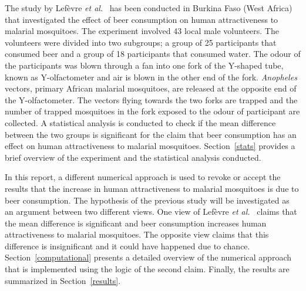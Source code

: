 The study by Lef\`evre \textit{et al.}~\cite{lefevre2010beer} has been conducted in Burkina Faso (West Africa) that investigated the effect of beer consumption on human attractiveness to malarial mosquitoes. The experiment involved 43 local male volunteers. The volunteers were divided into two subgroups; a group of 25 participants that consumed beer and a group of 18 participants that consumed water. The odour of the participants was blown through a fan into one fork of the Y-shaped tube, known as Y-olfactometer and air is blown in the other end of the fork. \textit{Anopheles} vectors, primary African malarial mosquitoes, are released at the opposite end of the Y-olfactometer. The vectors flying towards the two forks are trapped and the number of trapped mosquitoes in the fork exposed to the odour of participant are collected. A statistical analysis is conducted to check if the mean difference between the two groups is significant for the claim that beer consumption has an effect on human attractiveness to malarial mosquitoes. Section~\ref{stats} provides a brief overview of the experiment and the statistical analysis conducted.

In this report, a different numerical approach is used to revoke or accept the results that the increase in human attractiveness to malarial mosquitoes is due to beer consumption. The hypothesis of the previous study will be investigated as an argument between two different views. One view of Lef\`evre \textit{et al.}~\cite{lefevre2010beer} claims that the mean difference is significant and beer consumption increases human attractiveness to malarial mosquitoes. The opposite view  claims that this difference is insignificant and it could have happened  due to chance. Section~\ref{computational} presents a detailed overview of the numerical approach that is implemented using the logic of the second claim. Finally, the results are summarized in Section~\ref{results}.


